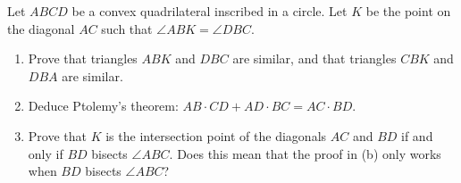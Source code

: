 Let $ABCD$ be a convex quadrilateral inscribed in a circle. Let $K$ be the point on the diagonal $AC$ such that $\angle ABK=\angle DBC$.
\begin{enumerate}
\item[(a)] Prove that triangles $ABK$ and $DBC$ are similar, and that triangles $CBK$ and $DBA$ are similar.
\item[(b)] Deduce Ptolemy's theorem: $AB\cdot CD+AD\cdot BC=AC\cdot BD$.
\item[(c)] Prove that $K$ is the intersection point of the diagonals $AC$ and $BD$ if and only if $BD$ bisects $\angle ABC$. Does this mean that the proof in (b) only works when $BD$ bisects $\angle ABC$?
\end{enumerate}
